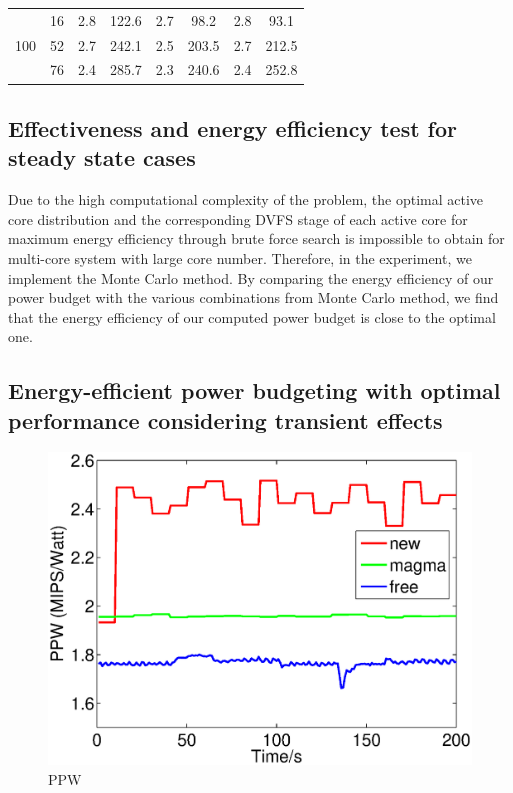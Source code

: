 \begin{table}
\begin{tabular}{c|c||c|c||c|c||c|c}
 \hline 
 \multirow{3}{*}{100} & 16 & 2.8 &  122.6   &   2.7  &  98.2   &   2.8   &   93.1  \\
                      & 52 & 2.7 &  242.1   &   2.5 &  203.5   &   2.7   &   212.5  \\
                      & 76 & 2.4 &  285.7   &  2.3   &  240.6   &   2.4   &   252.8  \\
\hline
  
\end{tabular}
\end{table}

\subsection{Effectiveness and energy efficiency test for steady state cases}
Due to the high computational complexity of the problem, the optimal active core distribution and the corresponding DVFS stage of each active core for maximum energy efficiency through brute force search is impossible to obtain for multi-core system with large core number. Therefore, in the experiment, we implement the Monte Carlo method. By comparing the energy efficiency of our power budget with the various combinations from Monte Carlo method, we find that the energy efficiency of our computed power budget is close to the optimal one.



\subsection{Energy-efficient power budgeting with optimal performance considering transient effects}

\begin{figure}
\centering
\includegraphics[width=1\linewidth]{fig/PPW.eps}
\caption{PPW}
\end{figure}

